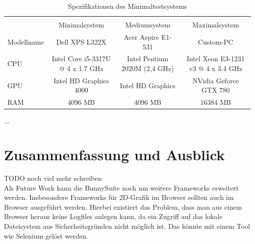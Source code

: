 \begin{table}
    \begin{tabular}{ | l | c | c | c |}
    \hline \\
    			& Minimalsystem						& Mediumsystem					& Maximalsystem							\\ \hline
    Modellname 	& Dell XPS L322X 					& Acer Aspire E1-531			& Custom-PC 							\\ \hline
    CPU 		& Intel Core i5-3317U @ 4 x 1.7 GHz & Intel Pentium 2020M (2,4 GHz) & Intel Xeon E3-1231 v3 @ 4 x 3.4 GHz 	\\ \hline
    GPU 		& Intel HD Graphics 4000 			& Intel HD Graphics				& NVidia Geforce GTX 780				\\ \hline
    RAM 		& 4096 MB 							& 4096 MB						& 16384 MB 								\\ \hline
    \end{tabular}
    \caption{Spezifikationen des Minimaltestsystems}
   	\label{tab:allspecs}
\end{table}

...

\chapter{Zusammenfassung und Ausblick}
TODO noch viel mehr schreiben
\\
Als Future Work kann die BunnySuite noch um weitere Frameworks erweitert werden. Insbesondere Frameworks für 2D-Grafik im Browser sollten auch im Browser ausgeführt werden. Hierbei existiert das Problem, dass man aus einem Browser heraus keine Logfiles anlegen kann, da ein Zugriff auf das lokale Dateisystem aus Sicherheitsgründen nicht möglich ist. Das könnte mit einem Tool wie Selenium gelöst werden.
